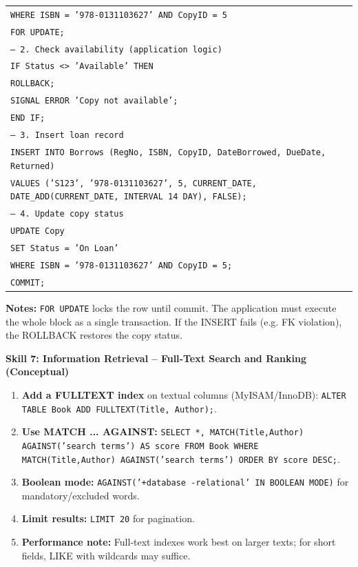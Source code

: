 \documentclass[11pt]{article}
\begin{document}
\begin{exoresolu}
\begin{enumerate}
\begin{center}
\begin{tabular}{|l|}
\texttt{WHERE ISBN = '978-0131103627' AND CopyID = 5} \\
\texttt{FOR UPDATE;} \\
\texttt{-- 2. Check availability (application logic)} \\
\texttt{IF Status <> 'Available' THEN} \\
\texttt{\quad ROLLBACK;} \\
\texttt{\quad SIGNAL ERROR 'Copy not available';} \\
\texttt{END IF;} \\
\texttt{-- 3. Insert loan record} \\
\texttt{INSERT INTO Borrows (RegNo, ISBN, CopyID, DateBorrowed, DueDate, Returned)} \\
\texttt{VALUES ('S123', '978-0131103627', 5, CURRENT\_DATE, DATE\_ADD(CURRENT\_DATE, INTERVAL 14 DAY), FALSE);} \\
\texttt{-- 4. Update copy status} \\
\texttt{UPDATE Copy} \\
\texttt{SET Status = 'On Loan'} \\
\texttt{WHERE ISBN = '978-0131103627' AND CopyID = 5;} \\
\texttt{COMMIT;} \\
\hline
\end{tabular}
\end{center}
\textbf{Notes:} \texttt{FOR UPDATE} locks the row until commit. The application must execute the whole block as a single transaction. If the INSERT fails (e.g. FK violation), the ROLLBACK restores the copy status.
\end{enumerate}
\end{exoresolu}

\textbf{Skill 7: Information Retrieval – Full‑Text Search and Ranking (Conceptual)}\par
\begin{methode}
\begin{enumerate}
\item \textbf{Add a FULLTEXT index} on textual columns (MyISAM/InnoDB): \texttt{ALTER TABLE Book ADD FULLTEXT(Title, Author);}.
\item \textbf{Use MATCH ... AGAINST:} \texttt{SELECT *, MATCH(Title,Author) AGAINST('search terms') AS score FROM Book WHERE MATCH(Title,Author) AGAINST('search terms') ORDER BY score DESC;}.
\item \textbf{Boolean mode:} \texttt{AGAINST('+database -relational' IN BOOLEAN MODE)} for mandatory/excluded words.
\item \textbf{Limit results:} \texttt{LIMIT 20} for pagination.
\item \textbf{Performance note:} Full‑text indexes work best on larger texts; for short fields, LIKE with wildcards may suffice.
\end{enumerate}
\end{methode}
\end{document}
